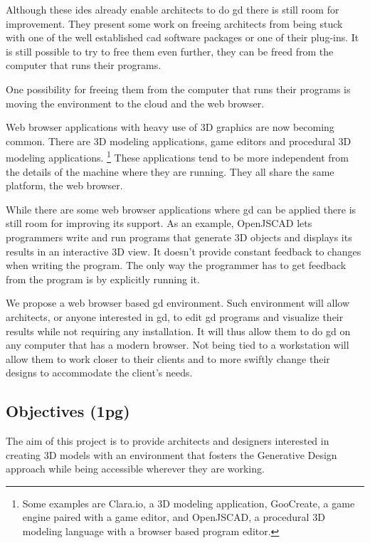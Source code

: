 \documentclass{./llncs2e/llncs}
\begin{document}
	Although these \ac{ide}s already enable architects to do \ac{gd} there is still room for improvement.
	They present some work on freeing architects from being stuck with one of the well established \ac{cad} software packages or one of their plug-ins.
	It is still possible to try to free them even further, they can be freed from the computer that runs their programs.

	One possibility for freeing them from the computer that runs their programs is moving the environment to the cloud and the web browser.


	Web browser applications with heavy use of 3D graphics are now becoming common.
	There are 3D modeling applications, game editors and procedural 3D modeling applications.
	\footnote{Some examples are Clara.io, a 3D modeling application, GooCreate, a game engine paired with a game editor, and OpenJSCAD, a procedural 3D modeling language with a browser based program editor.}
	These applications tend to be more independent from the details of the machine where they are running.
	They all share the same platform, the web browser.

	While there are some web browser applications where \ac{gd} can be applied there is still room for improving its support.
	As an example, OpenJSCAD lets programmers write and run programs that generate 3D objects and displays its results in an interactive 3D view.
	It doesn't provide constant feedback to changes when writing the program.
	The only way the programmer has to get feedback from the program is by explicitly running it.

	We propose a web browser based \ac{gd} environment. 
	Such environment will allow architects, or anyone interested in \ac{gd}, to edit \ac{gd} programs and visualize their results while not requiring any installation. 
	It will thus allow them to do \ac{gd} on any computer that has a modern browser. 
	Not being tied to a workstation will allow them to work closer to their clients and to more swiftly change their designs to accommodate the client's needs.

\subsection{Objectives (1pg)}
	The aim of this project is to provide architects and designers interested in creating 3D models with an environment that fosters the Generative Design approach while being accessible wherever they are working.
\end{document}
